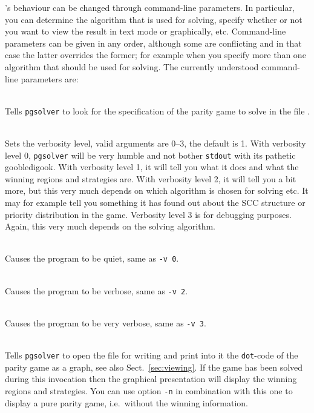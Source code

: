 \pgsolver's behaviour can be changed through command-line parameters. In particular, you can determine
the algorithm that is used for solving, specify whether or not you want to view the result in text
mode or graphically, etc. Command-line parameters can be given in any order, although some are
conflicting and in that case the latter overrides the former; for example when you specify more than
one algorithm that should be used for solving. The currently understood command-line parameters are:
\begin{description}
\itemsep3mm
\item[\nonterminal{filename}] \ \\
   Tells \texttt{pgsolver} to look for the specification of the parity game to solve in the file
   .

\item[{\ttfamily  -v \nonterminal{level}}] \ \\
   Sets the verbosity level, valid arguments are $0$--$3$, the default is 1. With verbosity level $0$,
   \texttt{pgsolver} will be very humble and not bother \texttt{stdout} with its pathetic goobledigook.
   With verbosity level 1, it will tell you what it does and what the winning regions and strategies
   are. With verbosity level 2, it will tell you a bit more, but this very much depends on which
   algorithm is chosen for solving etc. It may for example tell you something it has found out about the
   SCC structure or priority distribution in the game. Verbosity level 3 is for debugging purposes. Again,
   this very much depends on the solving algorithm.

\item[{\ttfamily --quiet}] \ \\
   Causes the program to be quiet, same as \texttt{-v 0}.

\item[{\ttfamily --verbose}] \ \\
   Causes the program to be verbose, same as \texttt{-v 2}.

\item[{\ttfamily --debug}] \ \\
   Causes the program to be very verbose, same as \texttt{-v 3}.

\item[{\ttfamily -d \nonterminal{filename}}] \ \\
   Tells \texttt{pgsolver} to open the file  for writing and print into it the
   \texttt{dot}-code of the parity game as a graph, see also Sect.~\ref{sec:viewing}. If the game has
   been solved during this invocation then the graphical presentation will display the winning regions
   and strategies. You can use option \texttt{-n} in combination with this one to display a pure parity
   game, i.e.\ without the winning information.


\end{description}
